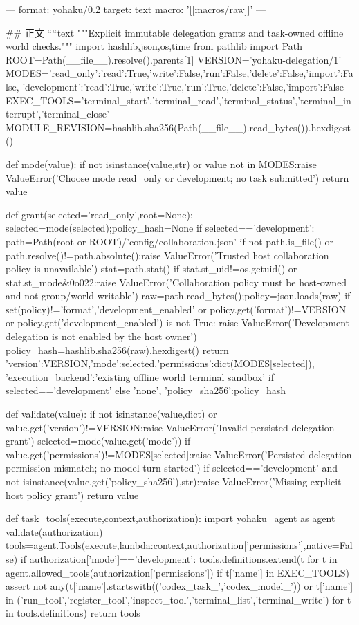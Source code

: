 ---
format: yohaku/0.2
target: text
macro: '[[macros/raw]]'
---

## 正文
````text
"""Explicit immutable delegation grants and task-owned offline world checks."""
import hashlib,json,os,time
from pathlib import Path
ROOT=Path(__file__).resolve().parents[1]
VERSION='yohaku-delegation/1'
MODES={'read_only':{'read':True,'write':False,'run':False,'delete':False,'import':False},
       'development':{'read':True,'write':True,'run':True,'delete':False,'import':False}}
EXEC_TOOLS={'terminal_start','terminal_read','terminal_status','terminal_interrupt','terminal_close'}
MODULE_REVISION=hashlib.sha256(Path(__file__).read_bytes()).hexdigest()

def mode(value):
    if not isinstance(value,str) or value not in MODES:raise ValueError('Choose mode read_only or development; no task submitted')
    return value

def grant(selected='read_only',root=None):
    selected=mode(selected);policy_hash=None
    if selected=='development':
        path=Path(root or ROOT)/'config/collaboration.json'
        if not path.is_file() or path.resolve()!=path.absolute():raise ValueError('Trusted host collaboration policy is unavailable')
        stat=path.stat()
        if stat.st_uid!=os.getuid() or stat.st_mode&0o022:raise ValueError('Collaboration policy must be host-owned and not group/world writable')
        raw=path.read_bytes();policy=json.loads(raw)
        if set(policy)!={'format','development_enabled'} or policy.get('format')!=VERSION or policy.get('development_enabled') is not True:
            raise ValueError('Development delegation is not enabled by the host owner')
        policy_hash=hashlib.sha256(raw).hexdigest()
    return {'version':VERSION,'mode':selected,'permissions':dict(MODES[selected]),
            'execution_backend':'existing offline world terminal sandbox' if selected=='development' else 'none',
            'policy_sha256':policy_hash}

def validate(value):
    if not isinstance(value,dict) or value.get('version')!=VERSION:raise ValueError('Invalid persisted delegation grant')
    selected=mode(value.get('mode'))
    if value.get('permissions')!=MODES[selected]:raise ValueError('Persisted delegation permission mismatch; no model turn started')
    if selected=='development' and not isinstance(value.get('policy_sha256'),str):raise ValueError('Missing explicit host policy grant')
    return value

def task_tools(execute,context,authorization):
    import yohaku_agent as agent
    validate(authorization)
    tools=agent.Tools(execute,lambda:context,authorization['permissions'],native=False)
    if authorization['mode']=='development':
        tools.definitions.extend(t for t in agent.allowed_tools(authorization['permissions']) if t['name'] in EXEC_TOOLS)
    assert not any(t['name'].startswith(('codex_task_','codex_model_')) or t['name'] in ('run_tool','register_tool','inspect_tool','terminal_list','terminal_write') for t in tools.definitions)
    return tools


